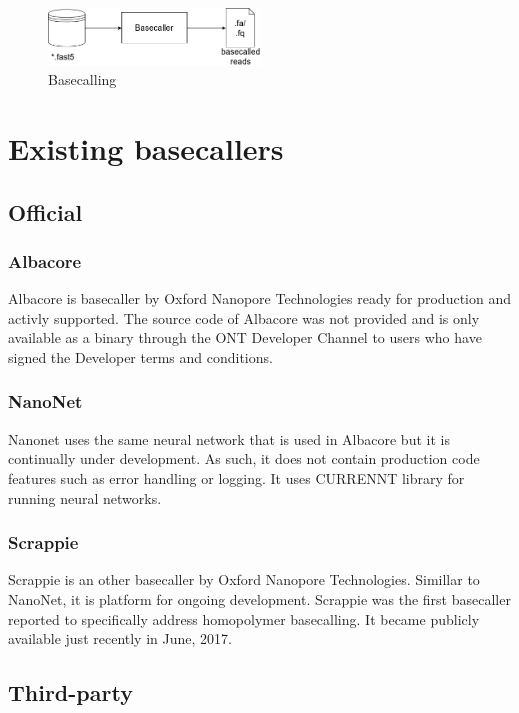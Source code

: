 \documentclass[times, utf8, diplomski, numeric, english]{fer}
\begin{document}
\begin{figure}[!ht]
	\begin{center}
		\includegraphics[width=0.5\textwidth]{./imgs/basecalling.png}
		\caption{Basecalling}
		\label{fg:basecalling}
	\end{center}
\end{figure}


\section{Existing basecallers}


\subsection{Official}
\subsubsection{Albacore}
Albacore is basecaller by Oxford Nanopore Technologies ready for production and activly supported.
The source code of Albacore was not provided and is only available as a binary through the ONT Developer Channel to users who have signed the Developer terms and conditions. 

\subsubsection{NanoNet}

Nanonet uses the same neural network that is used in Albacore but it is continually under development. As such, it does not contain production code features such as error handling or logging. It uses CURRENNT library for running neural networks.


\subsubsection{Scrappie}

Scrappie is an other basecaller by Oxford Nanopore Technologies. Simillar to NanoNet, it is platform for ongoing development. Scrappie was the first basecaller reported to specifically address homopolymer basecalling. It became publicly available just recently in June, 2017.

\subsection{Third-party}
\end{document}
